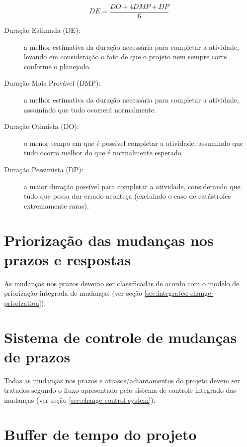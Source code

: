 \begin{itemize}
	      \begin{equation}\label{eq:time-pert}
		      DE = \frac{DO+4DMP+DP}{6}
	      \end{equation}

	      \begin{description}
		      \item[Duração Estimada (DE):] a melhor estimativa da duração necessária para completar a atividade, levando em consideração o fato de que o projeto nem sempre corre conforme o planejado.
		      \item[Duração Mais Provável (DMP):] a melhor estimativa da duração necessária para completar a atividade, assumindo que tudo ocorrerá normalmente.
		      \item[Duração Otimista (DO):] o menor tempo em que é possível completar a atividade, assumindo que tudo ocorra melhor do que é normalmente esperado.
		      \item[Duração Pessimista (DP):] a maior duração possível para completar a atividade, considerando que tudo que possa dar errado aconteça (excluindo o caso de catástrofes extremamente raras).
	      \end{description}
		  
\end{itemize}

\section{Priorização das mudanças nos prazos e respostas}

As mudanças nos prazos deverão ser classificadas de acordo com o modelo de priorização integrada de mudanças (ver seção \ref{sec:integrated-change-priorization}).

\section{Sistema de controle de mudanças de prazos}

Todas as mudanças nos prazos e atrasos/adiantamentos do projeto devem ser tratados segundo o fluxo apresentado pelo sistema de controle integrado das mudanças (ver seção \ref{sec:change-control-system}).


\section{Buffer de tempo do projeto}

